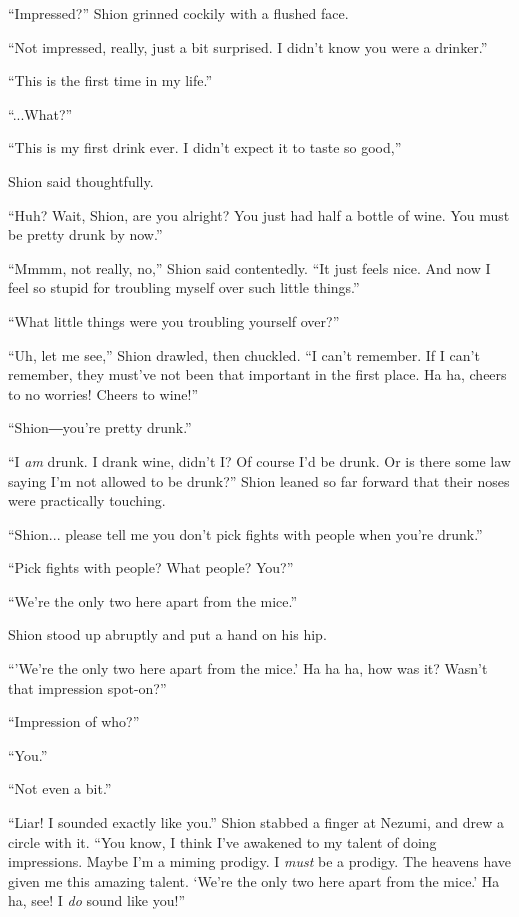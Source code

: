 ``Impressed?'' Shion grinned cockily with a flushed face.

``Not impressed, really, just a bit surprised. I didn't know you were a
drinker.''

``This is the first time in my life.''

``...What?''

``This is my first drink ever. I didn't expect it to taste so good,''~

Shion said thoughtfully.

``Huh? Wait, Shion, are you alright? You just had half a bottle of wine.
You must be pretty drunk by now.''

``Mmmm, not really, no,'' Shion said contentedly. ``It just feels nice.
And now I feel so stupid for troubling myself over such little things.''

``What little things were you troubling yourself over?''

``Uh, let me see,'' Shion drawled, then chuckled. ``I can't remember. If
I can't remember, they must've not been that important in the first
place. Ha ha, cheers to no worries! Cheers to wine!''

``Shion―you're pretty drunk.''

``I \emph{am} drunk. I drank wine, didn't I? Of course I'd be drunk. Or is
there some law saying I'm not allowed to be drunk?'' Shion leaned so far
forward that their noses were practically touching.

``Shion... please tell me you don't pick fights with people when you're
drunk.''

``Pick fights with people? What people? You?''

``We're the only two here apart from the mice.''

Shion stood up abruptly and put a hand on his hip.

``'We're the only two here apart from the mice.' Ha ha ha, how was it?
Wasn't that impression spot-on?''

``Impression of who?''

``You.''

``Not even a bit.''

``Liar! I sounded exactly like you.'' Shion stabbed a finger at Nezumi,
and drew a circle with it. ``You know, I think I've awakened to my
talent of doing impressions. Maybe I'm a miming prodigy. I \emph{must} be a
prodigy. The heavens have given me this amazing talent. `We're the only
two here apart from the mice.' Ha ha, see! I \emph{do} sound like you!''

